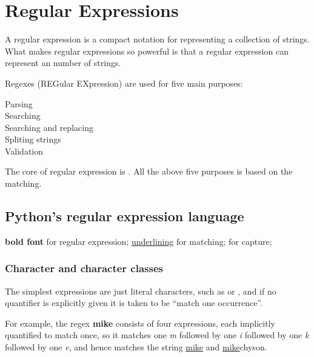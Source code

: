 
\chapter{Regular Expressions}

A regular expression is a compact notation for representing a collection of strings.
What makes regular expressions so powerful is that a  regular expression can represent an  number of strings.


Regexes (REGular EXpression) are used for five main purposes:
\begin{description}
\item[Parsing] 
\item[Searching] 
\item[Searching and replacing] 
\item[Spliting strings] 
\item[Validation] 
\end{description}

\begin{tcolorbox}
  The core of regular expression is .
  All the above five purposes is based on the matching.
\end{tcolorbox}


\section{Python's regular expression language}

\begin{tcolorbox}
  \textbf{bold font} for regular expression;
  \underline{underlining} for matching;
   for capture;
\end{tcolorbox}

\subsection{Character and character classes}

The simplest expressions are just literal characters, such as  or , and if no quantifier is explicitly given it is taken to be ``match one occurrence''.

For example, the regex \textbf{mike} consists of four expressions, each implicitly quantified to match once, so it matches one \textit{m} followed by one \textit{i} followed by one \textit{k} followed by one \textit{e}, and hence matches the string \underline{mike} and \underline{mike}chyson.


